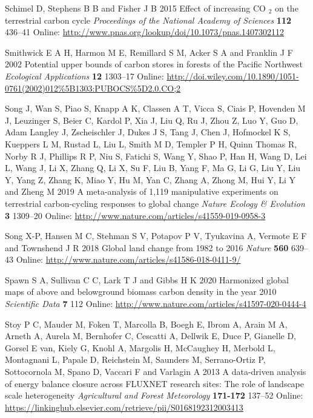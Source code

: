 \documentclass[
]{article}
\newlength{\cslhangindent}
\newenvironment{cslreferences}%
  {\setlength{\parindent}{0pt}%
  \everypar{\setlength{\hangindent}{\cslhangindent}}\ignorespaces}%
  {\par}
\begin{document}
\begin{cslreferences}
\leavevmode\hypertarget{ref-schimel_effect_2015}{}%
Schimel D, Stephens B B and Fisher J B 2015 Effect of increasing CO
\(_{\textrm{2}}\) on the terrestrial carbon cycle \emph{Proceedings of
the National Academy of Sciences} \textbf{112} 436--41 Online:
\url{http://www.pnas.org/lookup/doi/10.1073/pnas.1407302112}

\leavevmode\hypertarget{ref-smithwick_potential_2002}{}%
Smithwick E A H, Harmon M E, Remillard S M, Acker S A and Franklin J F
2002 Potential upper bounds of carbon stores in forests of the Pacific
Northwest \emph{Ecological Applications} \textbf{12} 1303--17 Online:
\url{http://doi.wiley.com/10.1890/1051-0761(2002)012\%5B1303:PUBOCS\%5D2.0.CO;2}

\leavevmode\hypertarget{ref-song_meta-analysis_2019}{}%
Song J, Wan S, Piao S, Knapp A K, Classen A T, Vicca S, Ciais P,
Hovenden M J, Leuzinger S, Beier C, Kardol P, Xia J, Liu Q, Ru J, Zhou
Z, Luo Y, Guo D, Adam Langley J, Zscheischler J, Dukes J S, Tang J, Chen
J, Hofmockel K S, Kueppers L M, Rustad L, Liu L, Smith M D, Templer P H,
Quinn Thomas R, Norby R J, Phillips R P, Niu S, Fatichi S, Wang Y, Shao
P, Han H, Wang D, Lei L, Wang J, Li X, Zhang Q, Li X, Su F, Liu B, Yang
F, Ma G, Li G, Liu Y, Liu Y, Yang Z, Zhang K, Miao Y, Hu M, Yan C, Zhang
A, Zhong M, Hui Y, Li Y and Zheng M 2019 A meta-analysis of 1,119
manipulative experiments on terrestrial carbon-cycling responses to
global change \emph{Nature Ecology \& Evolution} \textbf{3} 1309--20
Online: \url{http://www.nature.com/articles/s41559-019-0958-3}

\leavevmode\hypertarget{ref-song_global_2018}{}%
Song X-P, Hansen M C, Stehman S V, Potapov P V, Tyukavina A, Vermote E F
and Townshend J R 2018 Global land change from 1982 to 2016
\emph{Nature} \textbf{560} 639--43 Online:
\url{http://www.nature.com/articles/s41586-018-0411-9/}

\leavevmode\hypertarget{ref-spawn_harmonized_2020}{}%
Spawn S A, Sullivan C C, Lark T J and Gibbs H K 2020 Harmonized global
maps of above and belowground biomass carbon density in the year 2010
\emph{Scientific Data} \textbf{7} 112 Online:
\url{http://www.nature.com/articles/s41597-020-0444-4}

\leavevmode\hypertarget{ref-stoy_data-driven_2013}{}%
Stoy P C, Mauder M, Foken T, Marcolla B, Boegh E, Ibrom A, Arain M A,
Arneth A, Aurela M, Bernhofer C, Cescatti A, Dellwik E, Duce P, Gianelle
D, Gorsel E van, Kiely G, Knohl A, Margolis H, McCaughey H, Merbold L,
Montagnani L, Papale D, Reichstein M, Saunders M, Serrano-Ortiz P,
Sottocornola M, Spano D, Vaccari F and Varlagin A 2013 A data-driven
analysis of energy balance closure across FLUXNET research sites: The
role of landscape scale heterogeneity \emph{Agricultural and Forest
Meteorology} \textbf{171-172} 137--52 Online:
\url{https://linkinghub.elsevier.com/retrieve/pii/S0168192312003413}


\end{cslreferences}
\end{document}
